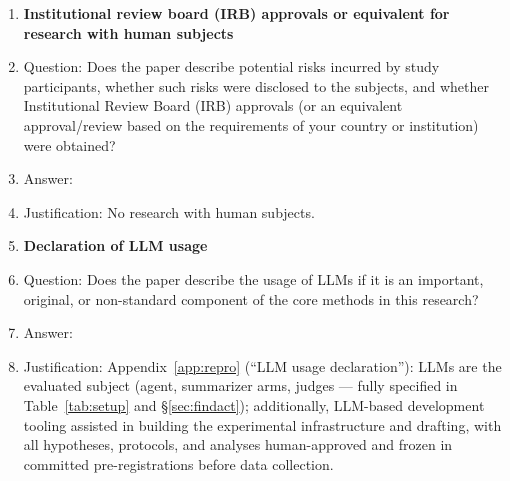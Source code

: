 \begin{enumerate}
\item {\bf Institutional review board (IRB) approvals or equivalent for research with human subjects}
    \item[] Question: Does the paper describe potential risks incurred by study participants, whether such risks were disclosed to the subjects, and whether Institutional Review Board (IRB) approvals (or an equivalent approval/review based on the requirements of your country or institution) were obtained?
    \item[] Answer: \answerNA{}
    \item[] Justification: No research with human subjects.

\item {\bf Declaration of LLM usage}
    \item[] Question: Does the paper describe the usage of LLMs if it is an important, original, or non-standard component of the core methods in this research?
    \item[] Answer: \answerYes{}
    \item[] Justification: Appendix~\ref{app:repro} (``LLM usage declaration''): LLMs are the evaluated subject (agent, summarizer arms, judges --- fully specified in Table~\ref{tab:setup} and \S\ref{sec:findact}); additionally, LLM-based development tooling assisted in building the experimental infrastructure and drafting, with all hypotheses, protocols, and analyses human-approved and frozen in committed pre-registrations before data collection.

\end{enumerate}

